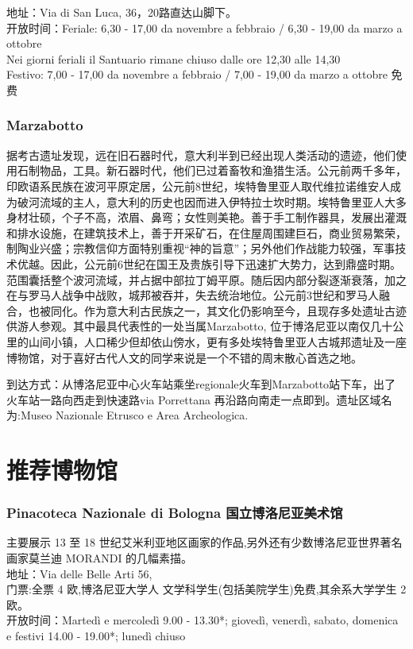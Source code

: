地址：Via di San Luca, 36，20路直达山脚下。\\
开放时间：Feriale: 6,30 - 17,00 da novembre a febbraio / 6,30 - 19,00 da marzo a ottobre \\
Nei giorni feriali il Santuario rimane chiuso dalle ore 12,30 alle 14,30 \\
Festivo: 7,00 - 17,00 da novembre a febbraio / 7,00 - 19,00 da marzo a ottobre 免费


\subsubsection{Marzabotto}
据考古遗址发现，远在旧石器时代，意大利半到已经出现人类活动的遗迹，他们使用石制物品，工具。新石器时代，他们已过着畜牧和渔猎生活。公元前两千多年，印欧语系民族在波河平原定居，公元前8世纪，埃特鲁里亚人取代维拉诺维安人成为破河流域的主人，意大利的历史也因而进入伊特拉士坎时期。埃特鲁里亚人大多身材壮硕，个子不高，浓眉、鼻弯；女性则美艳。善于手工制作器具，发展出灌溉和排水设施，在建筑技术上，善于开采矿石，在住屋周围建巨石，商业贸易繁荣，制陶业兴盛；宗教信仰方面特别重视“神的旨意”；另外他们作战能力较强，军事技术优越。因此，公元前6世纪在国王及贵族引导下迅速扩大势力，达到鼎盛时期。范围囊括整个波河流域，并占据中部拉丁姆平原。随后因内部分裂逐渐衰落，加之在与罗马人战争中战败，城邦被吞并，失去统治地位。公元前3世纪和罗马人融合，也被同化。作为意大利古民族之一，其文化仍影响至今，且现存多处遗址古迹供游人参观。其中最具代表性的一处当属Marzabotto, 位于博洛尼亚以南仅几十公里的山间小镇，人口稀少但却依山傍水，更有多处埃特鲁里亚人古城邦遗址及一座博物馆，对于喜好古代人文的同学来说是一个不错的周末散心首选之地。


到达方式：从博洛尼亚中心火车站乘坐regionale火车到Marzabotto站下车，出了火车站一路向西走到快速路via Porrettana 再沿路向南走一点即到。遗址区域名为:Museo Nazionale Etrusco e Area Archeologica.


\section{推荐博物馆}

\subsubsection{Pinacoteca Nazionale di Bologna 国立博洛尼亚美术馆}
主要展示 13 至 18 世纪艾米利亚地区画家的作品,另外还有少数博洛尼亚世界著名画家莫兰迪 MORANDI 的几幅素描。\\
地址：Via delle Belle Arti 56, \\
门票:全票 4 欧,博洛尼亚大学人 文学科学生(包括美院学生)免费,其余系大学学生 2 欧。\\
开放时间：Martedì e mercoledì 9.00 - 13.30*; giovedì, venerdì, sabato, domenica e festivi 14.00 - 19.00*; lunedì chiuso

